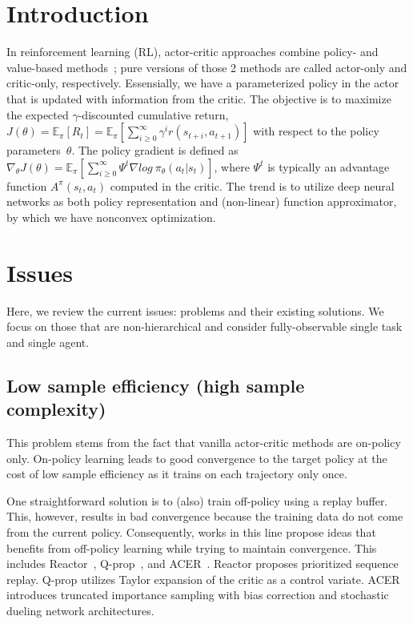 \section{Introduction}
In reinforcement learning (RL),
actor-critic approaches combine policy- and value-based methods~\cite{6392457};
pure versions of those 2 methods are called actor-only and critic-only, respectively.
Essensially, we have a parameterized policy in the actor that is
updated with information from the critic.
The objective is to maximize the expected $\gamma$-discounted cumulative return,
$J(\theta) = \mathbb{E}_{\pi} [R_t] = \mathbb{E}_{\pi} [ \sum_{i \ge 0}^{\infty} \gamma^i r(s_{t+i}, a_{t+1}) ]$
with respect to the policy parameters~$\theta$.
The policy gradient is defined as
$\nabla_{\theta} J(\theta) = \mathbb{E}_{\pi} [ \sum_{i \ge 0}^{\infty} \Psi^t \nabla log~\pi_{\theta} (a_t | s_t) ]$,
where $\Psi^t$ is typically an advantage function $A^{\pi}(s_t,a_t)$ computed in the critic.
The trend is to utilize deep neural networks as both policy representation and (non-linear) function approximator, by which we have nonconvex optimization.

\section{Issues}
Here, we review the current issues: problems and their existing solutions.
We focus on those that are non-hierarchical and
consider fully-observable single task and single agent.

\subsection{Low sample efficiency (high sample complexity)}
This problem stems from the fact that vanilla actor-critic methods are on-policy only.
On-policy learning leads to good convergence to the target policy at
the cost of low sample efficiency as it trains on each trajectory only once.

One straightforward solution is to (also) train off-policy using a replay buffer.
This, however, results in bad convergence because the training data do not come from the current policy.
Consequently, works in this line propose ideas that benefits from off-policy learning
while trying to maintain convergence.
This includes Reactor~\cite{Gruslys2018}, Q-prop~\cite{}, and ACER~\cite{}.
Reactor proposes prioritized sequence replay.
Q-prop utilizes Taylor expansion of the critic as a control variate.
ACER introduces truncated importance sampling with bias correction and
stochastic dueling network architectures.


